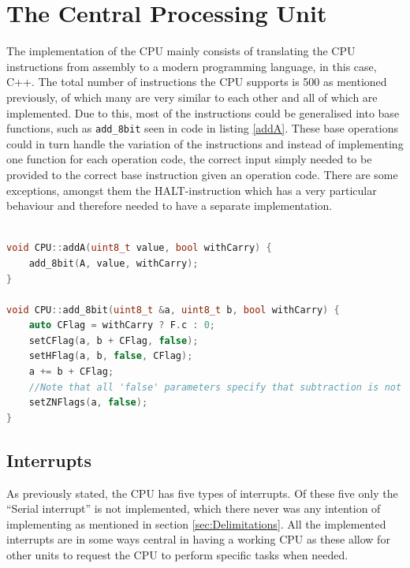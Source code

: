 \section{The Central Processing Unit}
\label{sec:CPUResults}
The implementation of the CPU mainly consists of translating the CPU instructions from assembly to a modern programming language, in this case, C++. The total number of instructions the CPU supports is 500 as mentioned previously, of which many are very similar to each other and all of which are implemented. Due to this, most of the instructions could be generalised into base functions, such as \texttt{add\_8bit} seen in code in listing \ref{addA}. These base operations could in turn handle the variation of the instructions and instead of implementing one function for each operation code, the correct input simply needed to be provided to the correct base instruction given an operation code. There are some exceptions, amongst them the HALT-instruction \cite{HALT-behaviour} which has a very particular behaviour and therefore needed to have a separate implementation.
\\\\
\begin{lstlisting}[language=C++,
caption = {Code displaying a generalised method used, in this case an addition function which allows for addition between register A and all other registers, both with and without the use of the carry bit.},
label = {addA}]
void CPU::addA(uint8_t value, bool withCarry) {
    add_8bit(A, value, withCarry);
}

void CPU::add_8bit(uint8_t &a, uint8_t b, bool withCarry) {
    auto CFlag = withCarry ? F.c : 0;
    setCFlag(a, b + CFlag, false);
    setHFlag(a, b, false, CFlag);
    a += b + CFlag;
    //Note that all 'false' parameters specify that subtraction is not used, which in turn affects how and which flags are set.
    setZNFlags(a, false);
}
\end{lstlisting}

\subsection{Interrupts}
As previously stated, the CPU has five types of interrupts. Of these five only the ``Serial interrupt'' is not implemented, which there never was any intention of implementing as mentioned in section \ref{sec:Delimitations}. All the implemented interrupts are in some ways central in having a working CPU as these allow for other units to request the CPU to perform specific tasks when needed.
\\\\
